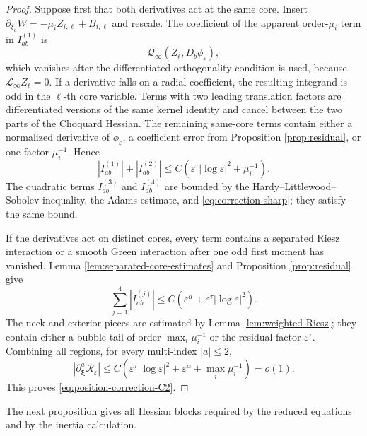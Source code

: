 \documentclass[11pt]{article}
\numberwithin{equation}{section}
\begin{document}
\begin{proof}
Suppose first that both derivatives act at the same core. Insert
$\partial_{\xi_a}W=-\mu_iZ_{i,\ell}+B_{i,\ell}$ and rescale.
The coefficient of the apparent order-$\mu_i$ term in
$I_{ab}^{(1)}$ is
\[
\mathcal Q_\infty
(Z_\ell,D_b\phi_\varepsilon),
\]
which vanishes after the differentiated orthogonality condition is
used, because $\mathcal L_\infty Z_\ell=0$. If a derivative falls
on a radial coefficient, the resulting integrand is odd in the
$\ell$-th core variable. Terms with two leading translation factors
are differentiated versions of the same kernel identity and cancel
between the two parts of the Choquard Hessian. The remaining
same-core terms contain either a normalized derivative of
$\phi_\varepsilon$, a coefficient error from Proposition
\ref{prop:residual}, or one factor $\mu_i^{-1}$. Hence
\[
|I_{ab}^{(1)}|+|I_{ab}^{(2)}|
\leq C\left(\varepsilon^\tau|\log\varepsilon|^2
+\mu_i^{-1}\right).
\]
The quadratic terms $I_{ab}^{(3)}$ and $I_{ab}^{(4)}$ are bounded by
the Hardy--Littlewood--Sobolev inequality, the Adams estimate, and
\eqref{eq:correction-sharp}; they satisfy the same bound.

If the derivatives act on distinct cores, every term contains a
separated Riesz interaction or a smooth Green interaction after one
odd first moment has vanished. Lemma
\ref{lem:separated-core-estimates} and Proposition
\ref{prop:residual} give
\[
\sum_{j=1}^4|I_{ab}^{(j)}|
\leq C\left(\varepsilon^\alpha
+\varepsilon^\tau|\log\varepsilon|^2\right).
\]
The neck and exterior pieces are estimated by Lemma
\ref{lem:weighted-Riesz}; they contain either a bubble tail of order
$\max_i\mu_i^{-1}$ or the residual factor $\varepsilon^\tau$.
Combining all regions, for every multi-index $|a|\leq2$,
\[
|\partial_{\boldsymbol\xi}^a
\mathcal R_\varepsilon|
\leq C\left(
\varepsilon^\tau|\log\varepsilon|^2
+\varepsilon^\alpha
+\max_i\mu_i^{-1}
\right)=o(1).
\]
This proves \eqref{eq:position-correction-C2}.
\end{proof}

The next proposition gives all Hessian blocks required by the reduced
equations and by the inertia calculation.
\end{document}

